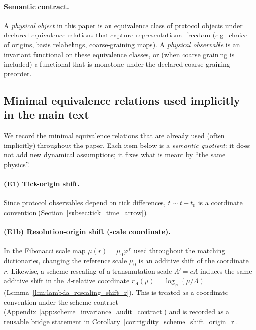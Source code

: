 \paragraph{Semantic contract.}
\InterfaceTag A \emph{physical object} in this paper is an equivalence class of protocol objects under declared equivalence relations that capture representational freedom (e.g.\ choice of origins, basis relabelings, coarse-graining maps).
A \emph{physical observable} is an invariant functional on these equivalence classes, or (when coarse graining is included) a functional that is monotone under the declared coarse-graining preorder.

\subsection{Minimal equivalence relations used implicitly in the main text}
\label{subsec:equivalence_relations_minimal}

We record the minimal equivalence relations that are already used (often implicitly) throughout the paper.
Each item below is a \emph{semantic quotient}: it does not add new dynamical assumptions; it fixes what is meant by ``the same physics''.

\paragraph{(E1) Tick-origin shift.}
\InterfaceTag Since protocol observables depend on tick differences, $t\sim t+t_0$ is a coordinate convention (Section~\ref{subsec:tick_time_arrow}).

\paragraph{(E1b) Resolution-origin shift (scale coordinate).}
\InterfaceTag In the Fibonacci scale map $\mu(r)=\mu_0\varphi^{\,r}$ used throughout the matching dictionaries, changing the reference scale $\mu_0$ is an additive shift of the coordinate $r$.
Likewise, a scheme rescaling of a transmutation scale $\Lambda'\!=c\Lambda$ induces the same additive shift in the $\Lambda$-relative coordinate $r_\Lambda(\mu)=\log_\varphi(\mu/\Lambda)$ (Lemma~\ref{lem:lambda_rescaling_shift_r}).
This is treated as a coordinate convention under the scheme contract (Appendix~\ref{app:scheme_invariance_audit_contract}) and is recorded as a reusable bridge statement in Corollary~\ref{cor:rigidity_scheme_shift_origin_r}.


